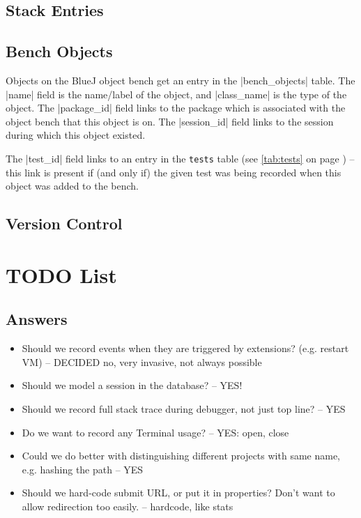 \documentclass{book}
\newcommand{\myref}[1]{\autoref{#1} on page \pageref*{#1}}
\newcommand{\tabref}[1]{\lstinline|#1| table (see \myref{tab:#1})}
\begin{document}



\section{Stack Entries}

\section{Bench Objects}


Objects on the BlueJ object bench get an entry in the |bench_objects|
table.  The |name| field is the name/label of the object, and
|class_name| is the type of the object.  The |package_id| field links
to the package which is associated with the object bench that this
object is on.  The |session_id| field links to the session during
which this object existed.

The |test_id| field links to an entry in the \tabref{tests} -- this
link is present if (and only if) the given test was being recorded
when this object was added to the bench.

\section{Version Control}



\chapter{TODO List}

\section{Answers}

\begin{itemize}
\item Should we record events when they are triggered by extensions?
  (e.g. restart VM) -- DECIDED no, very invasive, not always possible
\item Should we model a session in the database? -- YES!
\item Should we record full stack trace during debugger, not just top line? -- YES
\item Do we want to record any Terminal usage? -- YES: open, close
\item Could we do better with distinguishing different projects with same
  name, e.g. hashing the path -- YES
\item Should we hard-code submit URL, or put it in properties?  Don't want to
  allow redirection too easily. -- hardcode, like stats
\end{itemize}
\end{document}
